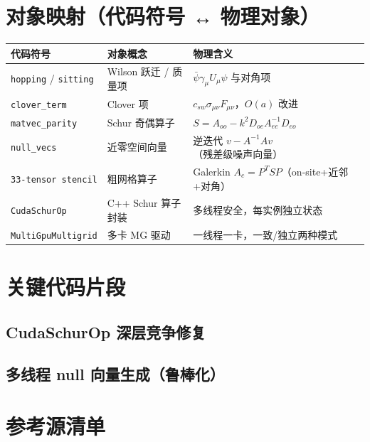 \documentclass[UTF8]{ctexart}
\begin{document}
\section{对象映射（代码符号 ↔ 物理对象）}

\begin{center}
\begin{tabular}{lll}
\toprule
代码符号 & 对象概念 & 物理含义 \\
\midrule
\texttt{hopping} / \texttt{sitting} & Wilson 跃迁 / 质量项 & $\bar\psi\gamma_\mu U_\mu\psi$ 与对角项 \\
\texttt{clover\_term} & Clover 项 & $c_{sw}\sigma_{\mu\nu}F_{\mu\nu}$，$O(a)$ 改进 \\
\texttt{matvec\_parity} & Schur 奇偶算子 & $S = A_{oo} - k^2 D_{oe} A_{ee}^{-1} D_{eo}$ \\
\texttt{null\_vecs} & 近零空间向量 & 逆迭代 $v - A^{-1}Av$（残差级噪声向量） \\
\texttt{33-tensor stencil} & 粗网格算子 & Galerkin $A_c = P^T S P$（on-site+近邻+对角）\\
\texttt{CudaSchurOp} & C++ Schur 算子封装 & 多线程安全，每实例独立状态 \\
\texttt{MultiGpuMultigrid} & 多卡 MG 驱动 & 一线程一卡，一致/独立两种模式 \\
\bottomrule
\end{tabular}
\end{center}

\section{关键代码片段}

\subsection{CudaSchurOp 深层竞争修复}


\subsection{多线程 null 向量生成（鲁棒化）}


\section{参考源清单}
\end{document}
